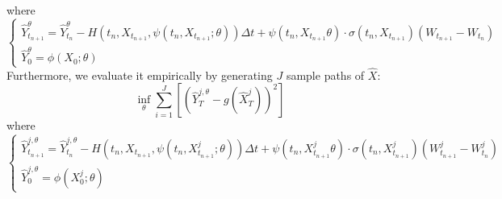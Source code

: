 \documentclass[11pt]{book}
\begin{document}
where
\begin{equation}
    \begin{cases}
        \hat{Y}^{\theta}_{t_{n+1}} = \hat{Y}^{\theta}_{t_{n}} -H(t_n,{X}_{t_{n+1}},\psi(t_n,{X}_{t_{n+1}};\theta))\Delta t + \psi(t_n,{X}_{t_{n+1}}\theta)\cdot\sigma(t_n,{X}_{t_{n+1}})(W_{t_{n+1}}-W_{t_{n}})\\
        \hat{Y}^{\theta}_0= \phi(X_0;\theta)
    \end{cases}
\end{equation}
Furthermore, we evaluate it empirically by generating $J$ sample paths of $\hat{X}$:
\[
\inf_{\theta}\sum_{i=1}^{J}\left[\left(\hat{Y}^{j,\theta}_T-g(\hat{X}^{j}_T)\right)^2\right]
\]
where
\begin{equation}
    \begin{cases}
        \hat{Y}^{j,\theta}_{t_{n+1}} = \hat{Y}^{j,\theta}_{t_{n}} -H(t_n,{X}_{t_{n+1}},\psi(t_n,{X}^{j}_{t_{n+1}};\theta))\Delta t + \psi(t_n,{X}^{j}_{t_{n+1}}\theta)\cdot\sigma(t_n,{X}^{j}_{t_{n+1}})(W^{j}_{t_{n+1}}-W^{j}_{t_{n}})\\
        \hat{Y}^{j,\theta}_0= \phi(X^{j}_0;\theta)
    \end{cases}
\end{equation}

\end{document}
